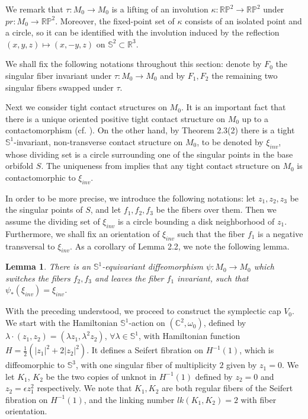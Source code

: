 \documentclass[11pt]{amsart}
\theoremstyle{plain}
\numberwithin{theorem}{section}
\newtheorem{lemma}[theorem]{Lemma}
\theoremstyle{definition}
\newcommand{\C}{{\mathbb C}}
\newcommand{\R}{{\mathbb R}}
\renewcommand{\P}{{\mathbb P}}
\newcommand{\s}{{\mathbb S}}
\begin{document}
We remark that $\tau: M_0\rightarrow M_0$ is a lifting of an involution $\kappa: \R\P^2\rightarrow \R\P^2$ under
$pr: M_0\rightarrow \R\P^2$. Moreover, the fixed-point set of $\kappa$ consists of an isolated point and a circle,
so it can be identified with the involution induced by the reflection $(x,y,z)\mapsto (x,-y,z)$ on $\s^2\subset \R^3$.


We shall fix the following notations throughout this section: denote by $F_0$ the singular fiber invariant under 
$\tau: M_0\rightarrow M_0$ and by $F_1,F_2$ the remaining two singular fibers swapped under $\tau$. 

\vspace{2mm}

Next we consider tight contact structures on $M_0$. It is an important fact that there is a unique oriented positive tight contact structure on $M_0$ up to a contactomorphism (cf. \cite{GLS}). 
On the other hand, by Theorem 2.3(2) there is a tight $\s^1$-invariant, non-transverse contact 
structure on $M_0$, to be denoted by $\xi_{inv}$, whose dividing set is a circle surrounding one of the singular points in the base orbifold $S$. The uniqueness from \cite{GLS} implies that any tight contact structure on $M_0$ is contactomorphic to $\xi_{inv}$. 

In order to be more precise, we introduce the following notations: let $z_1,z_2,z_3$
be the singular points of $S$, and let $f_1,f_2,f_3$ be the fibers over them. Then we
assume the dividing set of $\xi_{inv}$ is a circle bounding a disk neighborhood of $z_1$. 
Furthermore, we shall fix an orientation of $\xi_{inv}$ such that the fiber $f_1$ is a negative 
transversal to $\xi_{inv}$. As a corollary of Lemma 2.2, we note the following lemma. 

\begin{lemma}
There is an $\s^1$-equivariant diffeomorphism $\psi: M_0\rightarrow M_0$ which switches the fibers $f_2,f_3$ and
leaves the fiber $f_1$ invariant, such that $\psi_\ast(\xi_{inv})=\xi_{inv}$.
\end{lemma}

With the preceding understood, we proceed to construct the symplectic cap $V_0$. We start with 
the Hamiltonian $\s^1$-action on 
$(\C^2,\omega_0)$, defined by $\lambda\cdot (z_1,z_2)=(\lambda z_1,\lambda^2 z_2)$, $\forall \lambda\in\s^1$, with Hamiltonian function $H=\frac{1}{2}(|z_1|^2+2|z_2|^2)$. It defines a Seifert
fibration on $H^{-1}(1)$, which is diffeomorphic to $\s^3$, with one singular fiber of multiplicity $2$
given by $z_1=0$. We let $K_1$, $K_2$ be the two copies of unknot in $H^{-1}(1)$ defined by
$z_2=0$ and $z_2=\epsilon z_1^2$ respectively. We note that $K_1,K_2$ are both regular fibers
of the Seifert fibration on $H^{-1}(1)$, and the linking number $lk(K_1,K_2)=2$ with fiber
orientation. 
\end{document}
